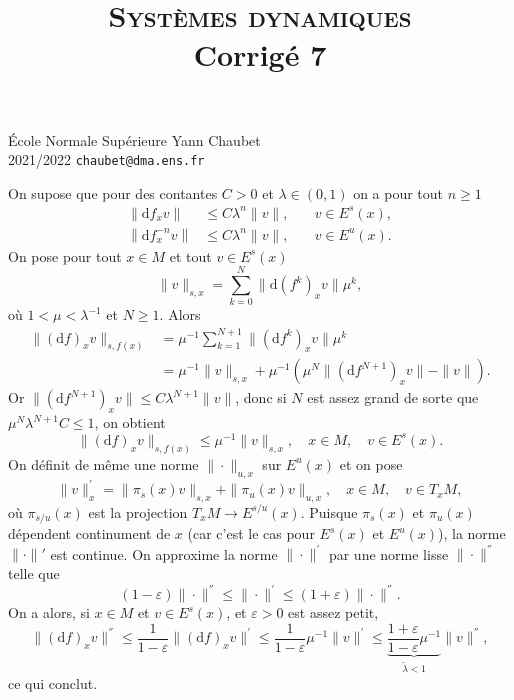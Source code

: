 \documentclass[a4paper,12pt,openany]{article}
\title{\textsc{Syst\`emes dynamiques} \\ Corrig\'e 7}
\date{}
\author{}
\theoremstyle{plain}
\theoremstyle{definition}
\newcommand{\dd}{\mathrm{d}}
\begin{document}
{\noindent \'Ecole Normale Sup\'erieure  \hfill Yann Chaubet } \\
{2021/2022 \hfill \texttt{chaubet@dma.ens.fr}}

{\let\newpage\relax\maketitle}
\maketitle

 \vspace{1.5mm} 

On supose que pour des contantes $C > 0$ et $\lambda \in (0, 1)$ on a pour tout $n \geqslant 1$
$$
\begin{aligned}
\left \|\dd f_x v \right\| &\leqslant C\lambda^n \| v \|, \quad &v \in E^s(x), \\
\left \|\dd f^{-n}_x v \right\| &\leqslant C\lambda^n \| v \|, \quad &v \in E^u(x).
\end{aligned}
$$
On pose pour tout $x \in M$ et tout $v \in E^s(x)$
$$
\|v\|_{s,x} = \sum_{k = 0}^N \|\dd (f^k)_x  v\| \mu^k,
$$
o\`u $1 < \mu < \lambda^{-1}$ et $N \geqslant 1$.
Alors
$$
\begin{aligned}
\| (\dd f)_x v\|_{s, f(x)} &= \mu^{-1} \sum_{k=1}^{N+1} \|(\dd f^k)_xv\| \mu^{k} \\
&= \mu^{-1} \|v\|_{s,x} + \mu^{-1}\left(\mu^N\|(\dd f^{N+1})_xv\| -\|v\|\right).
\end{aligned}
$$
Or 
$
\|(\dd f^{N+1})_x v\| \leq C \lambda^{N+1} \| v \|$, donc si $N$ est assez grand de sorte que $\mu^N \lambda^{N+1} C \leqslant 1$, on obtient
$$
\| (\dd f)_x v\|_{s, f(x)} \leqslant \mu^{-1} \|v\|_{s,x}, \quad x \in M, \quad v \in E^s(x).
$$
On d\'efinit de m\^eme une norme $\|\cdot\|_{u,x}$ sur $E^u(x)$ et on pose
$$
\|v\|^{'}_x = \|\pi_s(x)v\|_{s,x} + \|\pi_u(x)v\|_{u,x}, \quad x \in M, \quad v \in T_xM,
$$
o\`u $\pi_{s/u}(x)$ est la projection $T_xM \to E^{s/u}(x)$. Puisque $\pi_s(x)$ et $\pi_u(x)$ d\'ependent continument de $x$ (car c'est le cas pour $E^s(x)$ et $E^u(x)$), la norme $\|\cdot\|'$ est continue. On approxime la norme $\|\cdot\|^{'}$ par une norme lisse $\|\cdot\|^{''}$ telle que 
$$(1- \varepsilon) \|\cdot\|^{''} \leq \| \cdot \|^{'} \leq (1+\varepsilon)\|\cdot\|^{''}.$$
On a alors, si $x \in M$ et $v \in E^s(x)$, et $\varepsilon > 0$ est assez petit,
$$\|(\dd f)_xv\|^{''} \leqslant \frac{1}{1-\varepsilon} \|(\dd f)_xv\|^{'} \leqslant \frac{1}{1-\varepsilon} \mu^{-1} \|v\|^{'} \leqslant \underset{\displaystyle{ \tilde\lambda < 1}}{\underbrace{\frac{1 + \varepsilon}{1-\varepsilon}\mu^{-1}}} \|v\|^{''},$$
ce qui conclut.
\vspace{0.6cm}
\end{document}
